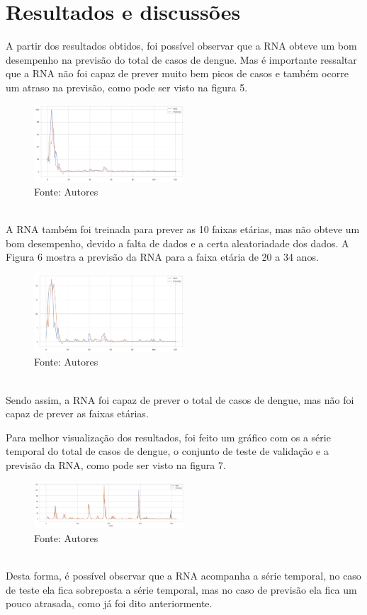 \documentclass[
	article,			%
	11pt,				%
	a4paper,			%
	chapter=TITLE,		%
	section=TITLE,		%
	subsection=TITLE,	%
	subsubsection=TITLE %
	english,			%
	brazil,				%
	sumario=tradicional
	]{abntex2}
\begin{document}
\section{Resultados e discussões}
A partir dos resultados obtidos, foi possível observar que a RNA obteve um bom desempenho na previsão do total de casos de dengue. Mas é importante ressaltar que a RNA não foi capaz de prever muito bem picos de casos e também ocorre um atraso na previsão, como pode ser visto na figura 5. 
\begin{figure}[htbp]
	\centering
	\includegraphics[width=0.5\textwidth]{imagens/imgCodigos/previsaoYtesteCasosTotais.png}
	\caption{Fonte: Autores}
	\label{figure5}
\end{figure}
\\ \indent
A RNA também foi treinada para prever as 10 faixas etárias, mas não obteve um bom desempenho, devido a falta de dados e a certa aleatoriadade dos dados. A Figura 6 mostra a previsão da RNA para a faixa etária de 20 a 34 anos.
\begin{figure}[htbp]
	\centering
	\includegraphics[width=0.5\textwidth]{imagens/imgCodigos/previsaoYteste2034.png}
	\caption{Fonte: Autores}
	\label{figure6}
\end{figure}
\\ \indent
Sendo assim, a RNA foi capaz de prever o total de casos de dengue, mas não foi capaz de prever as faixas etárias.
\\ \indent

Para melhor visualização dos resultados, foi feito um gráfico com os a série temporal do total de casos de dengue, o conjunto de teste de validação e a previsão da RNA, como pode ser visto na figura 7. 
\begin{figure}[htbp]
	\centering
	\includegraphics[width=0.5\textwidth]{imagens/imgCodigos/previsaoFullCasosTotais.png}
	\caption{Fonte: Autores}
	\label{figure7}
\end{figure}
\\ \indent
Desta forma, é possível observar que a RNA acompanha a série temporal, no caso de teste ela fica sobreposta a série temporal, mas no caso de previsão ela fica um pouco atrasada, como já foi dito anteriormente.
\\ \indent
\end{document}
